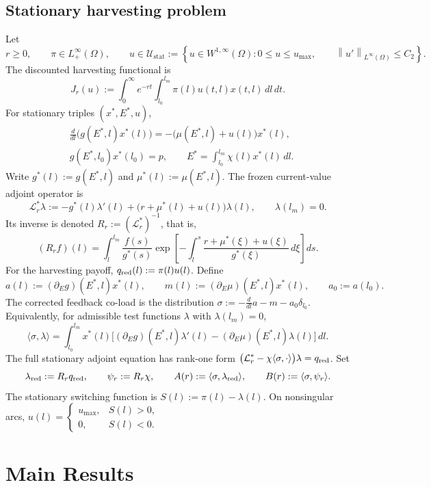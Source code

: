 \documentclass[pdflatex,sn-mathphys-num]{sn-jnl}
\theoremstyle{thmstyleone}
\theoremstyle{definition}
\theoremstyle{remark}
\newcommand{\Om}{\Omega}
\newcommand{\Lcal}{\mathcal{L}}
\newcommand{\Uad}{\mathcal{U}}
\newcommand{\norm}[1]{\left\lVert#1\right\rVert}
\numberwithin{equation}{section}
\begin{document}
\subsection{Stationary harvesting problem}
\label{subsec:model-control}
Let
\[
r\ge0,
\qquad
\pi\in L^\infty_+(\Om),
\qquad
u\in\Uad_\mathrm{stat}:=
\left\{
u\in W^{1,\infty}(\Om):
0\le u\le u_{\max},
\qquad
\norm{u'}_{L^\infty(\Om)}\le C_2
\right\}.
\]
The discounted harvesting functional is
\[
J_r(u)
:=
\int_0^\infty e^{-rt}
\int_{l_0}^{l_m}
\pi(l)u(t,l)x(t,l)\,dl\,dt .
\]
For stationary triples \((x^*,E^*,u)\),
\begin{align}
&\frac{d}{dl}\big(g(E^*,l)x^*(l)\big)
=
-\big(\mu(E^*,l)+u(l)\big)x^*(l),
\label{eq:model-stationary-state}
\\
&g(E^*,l_0)x^*(l_0)=p,
\qquad
E^*=\int_{l_0}^{l_m}\chi(l)x^*(l)\,dl .
\label{eq:model-stationary-state-bc}
\end{align}
Write
$\displaystyle g^*(l):=g(E^*,l)$ and
$\displaystyle \mu^*(l):=\mu(E^*,l)$.
The frozen current-value adjoint operator is
\[
\Lcal_r^*\lambda
:=
-g^*(l)\lambda'(l)
+
\big(r+\mu^*(l)+u(l)\big)\lambda(l),
\qquad
\lambda(l_m)=0.
\]
Its inverse is denoted
$\displaystyle R_r:=(\Lcal_r^*)^{-1}$,
that is,
\[
(R_r f)(l)
=
\int_l^{l_m}
\frac{f(s)}{g^*(s)}
\exp\!\left[
-\int_l^s
\frac{r+\mu^*(\xi)+u(\xi)}{g^*(\xi)}\,d\xi
\right]ds.
\]
For the harvesting payoff,
$\displaystyle 
q_{\rm red}(l):=\pi(l)u(l)$.
Define
\[
a(l):=(\partial_E g)(E^*,l)x^*(l),
\qquad
m(l):=(\partial_E\mu)(E^*,l)x^*(l),
\qquad
a_0:=a(l_0).
\]
The corrected feedback co-load is the distribution
$\displaystyle \sigma
:=
-\frac{d}{dl}a-m-a_0\delta_{l_0}$.
Equivalently, for admissible test functions \(\lambda\) with \(\lambda(l_m)=0\),
\[
\langle\sigma,\lambda\rangle
=
\int_{l_0}^{l_m}
x^*(l)
\Big[
(\partial_E g)(E^*,l)\lambda'(l)
-
(\partial_E\mu)(E^*,l)\lambda(l)
\Big]\,dl.
\]
The full stationary adjoint equation has rank-one form
$\displaystyle \big(\Lcal_r^*-\chi\langle\sigma,\cdot\rangle\big)\lambda
=
q_{\rm red}$.
Set
\[
\lambda_{\rm red}:=R_r q_{\rm red},
\qquad
\psi_r:=R_r\chi,
\qquad
A(r):=\langle\sigma,\lambda_{\rm red}\rangle,
\qquad
B(r):=\langle\sigma,\psi_r\rangle .
\]
The stationary switching function is
$\displaystyle S(l):=\pi(l)-\lambda(l)$.
On nonsingular arcs,
$\displaystyle 
u(l)=
\begin{cases}
u_{\max}, & S(l)>0,\\
0, & S(l)<0.
\end{cases}$
\section{Main Results}
\label{sec:main-results}
\end{document}
